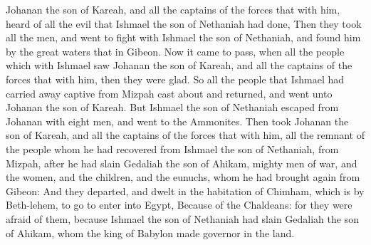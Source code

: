 {Johanan the
son of
Kareah, and all the
captains of the
forces that
{} with him,
heard of all the
evil that
Ishmael the
son of
Nethaniah had
done,
Then they
took all the
men, and
went to
fight with
Ishmael the
son of
Nethaniah, and
found him by the
great
waters that
{} in
Gibeon.
Now it came to pass,
{} when all the
people which
{} with
Ishmael
saw
Johanan the
son of
Kareah, and all the
captains of the
forces that
{} with him, then they were
glad.
So all the
people that
Ishmael had carried away
captive from
Mizpah cast
about and
returned, and
went unto
Johanan the
son of
Kareah.
But
Ishmael the
son of
Nethaniah
escaped
from
Johanan with
eight
men, and
went to the
Ammonites.
Then
took
Johanan the
son of
Kareah, and all the
captains of the
forces that
{} with him, all the
remnant of the
people whom he had
recovered from
Ishmael the
son of
Nethaniah, from
Mizpah,
after
{} he had
slain
Gedaliah the
son of
Ahikam,
{}
mighty
men of
war, and the
women, and the
children, and the
eunuchs, whom he had brought
again from
Gibeon:
And they
departed, and dwelt
in the
habitation of
Chimham, which is
by
Beth-lehem, to
go to
enter into
Egypt,
Because of the
Chaldeans: for they were
afraid of them, because
Ishmael the
son of
Nethaniah had
slain
Gedaliah the
son of
Ahikam, whom the
king of
Babylon made
governor in the
land.

}
